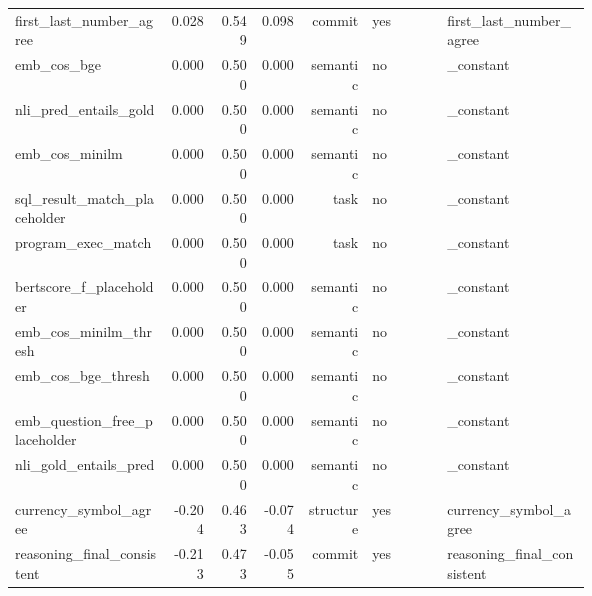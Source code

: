 \begin{longtable}{p{0.278\linewidth}rrrrp{0.134\linewidth}p{0.259\linewidth}}
first\_\allowbreak{}last\_\allowbreak{}number\_\allowbreak{}agree & 0.028 & 0.549 & 0.098 & commit & yes & first\_\allowbreak{}last\_\allowbreak{}number\_\allowbreak{}agree \\
emb\_\allowbreak{}cos\_\allowbreak{}bge & 0.000 & 0.500 & 0.000 & semantic & no & \_\allowbreak{}constant \\
nli\_\allowbreak{}pred\_\allowbreak{}entails\_\allowbreak{}gold & 0.000 & 0.500 & 0.000 & semantic & no & \_\allowbreak{}constant \\
emb\_\allowbreak{}cos\_\allowbreak{}minilm & 0.000 & 0.500 & 0.000 & semantic & no & \_\allowbreak{}constant \\
sql\_\allowbreak{}result\_\allowbreak{}match\_\allowbreak{}placeholder & 0.000 & 0.500 & 0.000 & task & no & \_\allowbreak{}constant \\
program\_\allowbreak{}exec\_\allowbreak{}match & 0.000 & 0.500 & 0.000 & task & no & \_\allowbreak{}constant \\
bertscore\_\allowbreak{}f\_\allowbreak{}placeholder & 0.000 & 0.500 & 0.000 & semantic & no & \_\allowbreak{}constant \\
emb\_\allowbreak{}cos\_\allowbreak{}minilm\_\allowbreak{}thresh & 0.000 & 0.500 & 0.000 & semantic & no & \_\allowbreak{}constant \\
emb\_\allowbreak{}cos\_\allowbreak{}bge\_\allowbreak{}thresh & 0.000 & 0.500 & 0.000 & semantic & no & \_\allowbreak{}constant \\
emb\_\allowbreak{}question\_\allowbreak{}free\_\allowbreak{}placeholder & 0.000 & 0.500 & 0.000 & semantic & no & \_\allowbreak{}constant \\
nli\_\allowbreak{}gold\_\allowbreak{}entails\_\allowbreak{}pred & 0.000 & 0.500 & 0.000 & semantic & no & \_\allowbreak{}constant \\
currency\_\allowbreak{}symbol\_\allowbreak{}agree & -0.204 & 0.463 & -0.074 & structure & yes & currency\_\allowbreak{}symbol\_\allowbreak{}agree \\
reasoning\_\allowbreak{}final\_\allowbreak{}consistent & -0.213 & 0.473 & -0.055 & commit & yes & reasoning\_\allowbreak{}final\_\allowbreak{}consistent \\
\bottomrule
\end{longtable}
\normalsize
